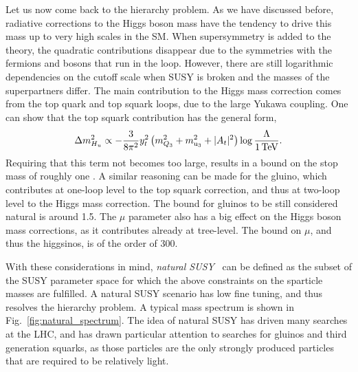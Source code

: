 Let us now come back to the hierarchy problem. As we have discussed before, radiative corrections
to the Higgs boson mass have the tendency to drive this mass up to very high scales in the SM. When
 supersymmetry is added to the theory, the quadratic contributions disappear due to the symmetries
with the fermions and bosons that run in the loop. However, there are still logarithmic dependencies
on the cutoff scale when SUSY is broken and the masses of the superpartners differ. 
The main contribution to the Higgs mass correction comes from the top quark and top squark loops,
due to the large Yukawa coupling. One can show that the top squark contribution has the general
form,
\begin{equation}
  \Delta m_{H_u}^2 \propto - \frac{3}{8\pi^2} y^2_t \left( m^2_{Q_3} + m^2_{\mathrm{u}_3} + |A_t|^2 
  \right) \log \frac{\Lambda}{1\,\text{Te\hspace{-.08em}V}} .
\end{equation}
Requiring that this term not becomes too large, results in a bound on the stop mass of roughly
one \TeV. A similar reasoning can be made for the gluino, which contributes at one-loop level to the
top squark correction, and thus at two-loop level to the Higgs mass correction. The bound for
gluinos to be still considered natural is around 1.5\TeV. 
The $\mu$ parameter also has a big effect on the Higgs boson mass corrections, as it contributes
already at tree-level. The bound on $\mu$, and thus the higgsinos, is of the order of 300\GeV. 

With these considerations in mind, \textit{natural SUSY}~\cite{Barbieri:2009ev,Papucci:2011wy} can
be defined as the subset of the SUSY parameter space for which the above constraints on the
sparticle masses are fulfilled. 
A natural SUSY scenario has low fine tuning, and thus resolves the hierarchy problem. A typical mass
spectrum is shown in Fig.~\ref{fig:natural_spectrum}. The idea of natural SUSY has driven many
searches at the LHC, and has drawn particular attention to searches for gluinos and third
generation squarks, as those particles are the only strongly produced particles that are required
to be relatively light. 


